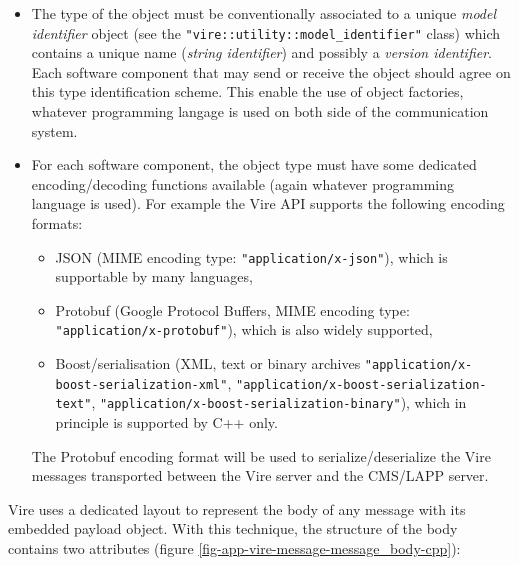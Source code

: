 \begin{itemize}

\item The  type of the object  must be conventionally associated  to a
  unique     \emph{model      identifier}     object      (see     the
  \texttt{"vire::utility::model\_identifier"} class)  which contains a
  unique   name   (\textit{string    identifier})   and   possibly   a
  \textit{version identifier}.  Each software  component that may send
  or  receive the  object  should agree  on  this type  identification
  scheme.   This   enable  the  use  of   object  factories,  whatever
  programming  langage  is used  on  both  side of  the  communication
  system.

\item  For each  software component,  the object  type must  have some
  dedicated  encoding/decoding  functions  available  (again  whatever
  programming language is used). For example the Vire API supports the
  following encoding formats:

  \begin{itemize}

  \item JSON (MIME  encoding type: \texttt{"application/x-json"}), which
    is supportable by many languages,

  \item  Protobuf  (Google  Protocol   Buffers,  MIME  encoding  type:
    \texttt{"application/x-protobuf"}), which is also widely supported,

  \item   Boost/serialisation   (XML,    text   or   binary   archives
    \texttt{"application/x-boost-serialization-xml"},
    \texttt{"application/x-boost-serialization-text"},
    \texttt{"application/x-boost-serialization-binary"}),    which    in
    principle is supported by C++ only.

  \end{itemize}

  The Protobuf  encoding format will be  used to serialize/deserialize
  the  Vire  messages transported  between  the  Vire server  and  the
  CMS/LAPP server.

\end{itemize}

Vire uses a dedicated layout to represent the body of any message with
its embedded payload object. With this technique, the structure of the
body          contains         two          attributes         (figure
\ref{fig-app-vire-message-message_body-cpp}):

